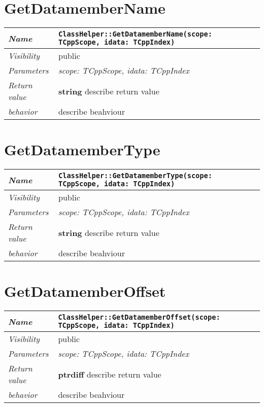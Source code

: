  \section{GetDatamemberName}
\begin{longtable}{p{3cm} @{\hskip 1cm} p{12cm}}
 \hline
\textit{Name} & \texttt{ClassHelper::GetDatamemberName(scope: TCppScope, idata: TCppIndex)}\\
\hline
 \textit{Visibility} & public\\
\hline
\textit{Parameters} & \textit{scope: TCppScope, idata: TCppIndex}\\
\hline
\textit{Return value} & \textbf{ string} describe return value\\
  \hline
 \textit{behavior} & describe beahviour \\
\hline
\end{longtable} \pagebreak
 \section{GetDatamemberType}
\begin{longtable}{p{3cm} @{\hskip 1cm} p{12cm}}
 \hline
\textit{Name} & \texttt{ClassHelper::GetDatamemberType(scope: TCppScope, idata: TCppIndex)}\\
\hline
 \textit{Visibility} & public\\
\hline
\textit{Parameters} & \textit{scope: TCppScope, idata: TCppIndex}\\
\hline
\textit{Return value} & \textbf{ string} describe return value\\
  \hline
 \textit{behavior} & describe beahviour \\
\hline
\end{longtable} \pagebreak
 \section{GetDatamemberOffset}
\begin{longtable}{p{3cm} @{\hskip 1cm} p{12cm}}
 \hline
\textit{Name} & \texttt{ClassHelper::GetDatamemberOffset(scope: TCppScope, idata: TCppIndex)}\\
\hline
 \textit{Visibility} & public\\
\hline
\textit{Parameters} & \textit{scope: TCppScope, idata: TCppIndex}\\
\hline
\textit{Return value} & \textbf{ ptrdiff} describe return value\\
  \hline
 \textit{behavior} & describe beahviour \\
\hline
\end{longtable} \pagebreak
